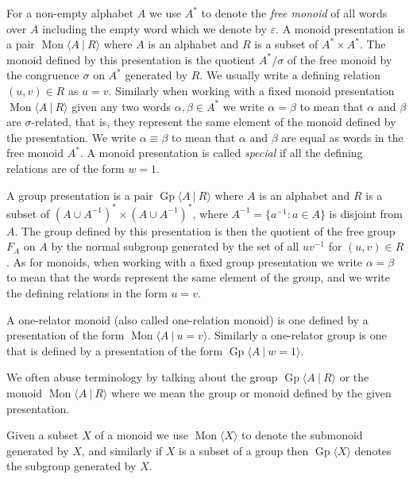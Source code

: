 \documentclass{amsart}
\newcommand{\Mpres}[2]{\operatorname{Mon}\bigl\langle #1\:|\:#2 \bigr\rangle}
\newcommand{\Mgen}[1]{\operatorname{Mon}\bigl\langle #1 \bigr\rangle}
\newcommand{\Ggen}[1]{\operatorname{Gp}\bigl\langle #1 \bigr\rangle}
\newcommand{\Gpres}[2]{\operatorname{Gp}\bigl\langle #1\:|\:#2 \bigr\rangle}
\theoremstyle{plain}
\theoremstyle{definition}
\begin{document}
For a non-empty alphabet $A$ we use $A^*$ to denote the \emph{free monoid} of all words over $A$ including the empty word which we denote by $\varepsilon$.    
A monoid presentation is a pair $\Mpres{A}{R}$ where $A$ is an alphabet and $R$ is a subset of $A^* \times A^*$. The monoid defined by this presentation is the quotient $A^* / \sigma$ of the free monoid by the congruence $\sigma$ on $A^*$ generated by $R$. We usually write a defining relation $(u,v) \in R$ as $u=v$. 
Similarly when working with a fixed monoid presentation $\Mpres{A}{R}$ given any two words $\alpha,\beta \in A^*$ we write $\alpha=\beta$ to mean that $\alpha$ and $\beta$ are $\sigma$-related, that is, they represent the same element of the monoid defined by the presentation. 
We write $\alpha \equiv \beta$ to mean that $\alpha$ and $\beta$ are equal as words in the free monoid $A^*$.       
A monoid presentation is called \emph{special} if all the defining relations are of the form $w=1$. 

A group presentation is a pair $\Gpres{A}{R}$ where $A$ is an alphabet and $R$ is a subset of  $(A \cup A^{-1})^* \times (A \cup A^{-1})^*$, where $A^{-1} = \{a^{-1} : a \in A \} $ is disjoint from $A$.     
The group defined by this presentation is then the quotient of the free group $F_A$ on $A$ by the normal subgroup generated by the set of all $uv^{-1}$ for $(u,v) \in R$. As for monoids, when working with a fixed group presentation we write $\alpha = \beta$ to mean that the words represent the same element of the group, and we write the defining relations in the form $u=v$.      

A one-relator monoid (also called one-relation monoid) is one defined by a presentation of the form $\Mpres{A}{u=v}$. Similarly a one-relator group is one that is defined by a presentation of the form $\Gpres{A}{w=1}$.  

We often abuse terminology by talking about the group $\Gpres{A}{R}$ or the monoid $\Mpres{A}{R}$ where we mean the group or monoid defined by the given presentation.   

Given a subset $X$ of a monoid we use $\Mgen{X}$ to denote the submonoid generated by $X$, and similarly if $X$ is a subset of a group then $\Ggen{X}$ denotes the subgroup generated by $X$. 
\end{document}
